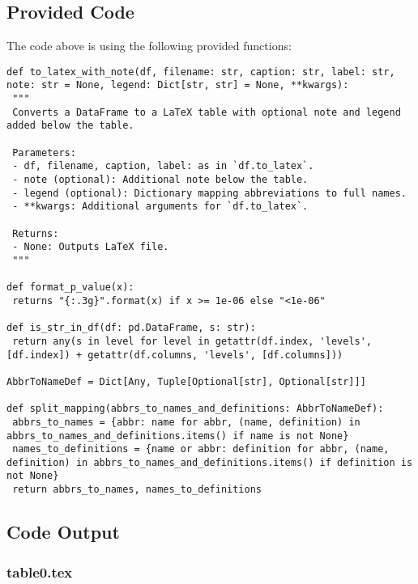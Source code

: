 \documentclass[11pt]{article}
\begin{document}
\subsection{Provided Code}
The code above is using the following provided functions:

\begin{verbatim}
def to_latex_with_note(df, filename: str, caption: str, label: str, note: str = None, legend: Dict[str, str] = None, **kwargs):
 """
 Converts a DataFrame to a LaTeX table with optional note and legend added below the table.

 Parameters:
 - df, filename, caption, label: as in `df.to_latex`.
 - note (optional): Additional note below the table.
 - legend (optional): Dictionary mapping abbreviations to full names.
 - **kwargs: Additional arguments for `df.to_latex`.

 Returns:
 - None: Outputs LaTeX file.
 """

def format_p_value(x):
 returns "{:.3g}".format(x) if x >= 1e-06 else "<1e-06"

def is_str_in_df(df: pd.DataFrame, s: str):
 return any(s in level for level in getattr(df.index, 'levels', [df.index]) + getattr(df.columns, 'levels', [df.columns]))

AbbrToNameDef = Dict[Any, Tuple[Optional[str], Optional[str]]]

def split_mapping(abbrs_to_names_and_definitions: AbbrToNameDef):
 abbrs_to_names = {abbr: name for abbr, (name, definition) in abbrs_to_names_and_definitions.items() if name is not None}
 names_to_definitions = {name or abbr: definition for abbr, (name, definition) in abbrs_to_names_and_definitions.items() if definition is not None}
 return abbrs_to_names, names_to_definitions

\end{verbatim}



\subsection{Code Output}

\subsubsection*{table0.tex}
\end{document}
